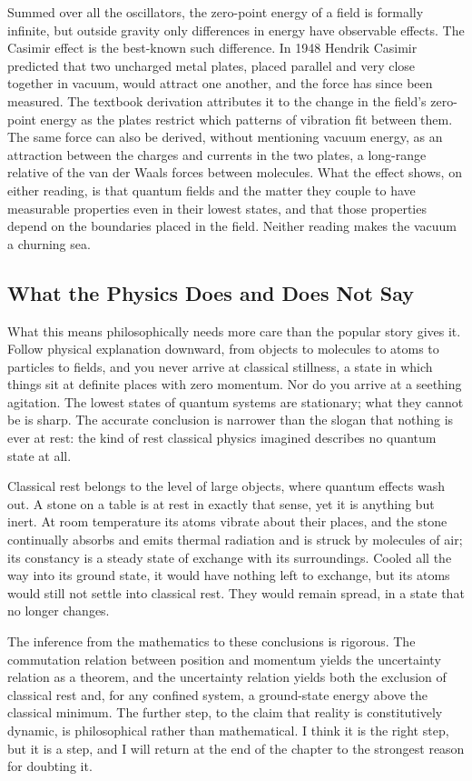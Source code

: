 Summed over all the oscillators, the zero-point energy of a field is formally infinite, but outside gravity only differences in energy have observable effects. The Casimir effect is the best-known such difference. In 1948 Hendrik Casimir predicted that two uncharged metal plates, placed parallel and very close together in vacuum, would attract one another, and the force has since been measured. The textbook derivation attributes it to the change in the field's zero-point energy as the plates restrict which patterns of vibration fit between them. The same force can also be derived, without mentioning vacuum energy, as an attraction between the charges and currents in the two plates, a long-range relative of the van der Waals forces between molecules. What the effect shows, on either reading, is that quantum fields and the matter they couple to have measurable properties even in their lowest states, and that those properties depend on the boundaries placed in the field. Neither reading makes the vacuum a churning sea.

\subsection*{What the Physics Does and Does Not Say}

What this means philosophically needs more care than the popular story gives it. Follow physical explanation downward, from objects to molecules to atoms to particles to fields, and you never arrive at classical stillness, a state in which things sit at definite places with zero momentum. Nor do you arrive at a seething agitation. The lowest states of quantum systems are stationary; what they cannot be is sharp. The accurate conclusion is narrower than the slogan that nothing is ever at rest: the kind of rest classical physics imagined describes no quantum state at all.

Classical rest belongs to the level of large objects, where quantum effects wash out. A stone on a table is at rest in exactly that sense, yet it is anything but inert. At room temperature its atoms vibrate about their places, and the stone continually absorbs and emits thermal radiation and is struck by molecules of air; its constancy is a steady state of exchange with its surroundings. Cooled all the way into its ground state, it would have nothing left to exchange, but its atoms would still not settle into classical rest. They would remain spread, in a state that no longer changes.

The inference from the mathematics to these conclusions is rigorous. The commutation relation between position and momentum yields the uncertainty relation as a theorem, and the uncertainty relation yields both the exclusion of classical rest and, for any confined system, a ground-state energy above the classical minimum. The further step, to the claim that reality is constitutively dynamic, is philosophical rather than mathematical. I think it is the right step, but it is a step, and I will return at the end of the chapter to the strongest reason for doubting it.


